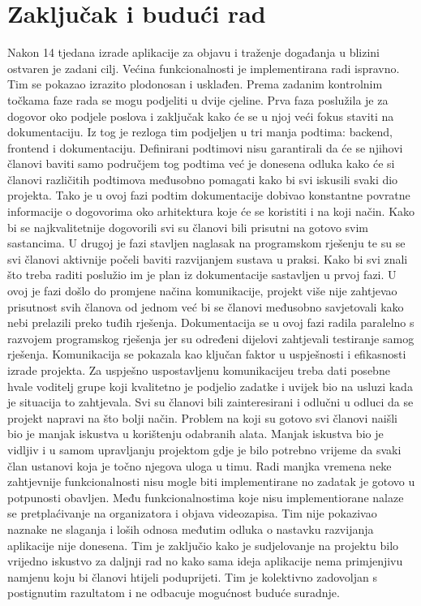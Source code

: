 \chapter{Zaključak i budući rad}
		
		Nakon 14 tjedana izrade aplikacije za objavu i traženje događanja u blizini ostvaren je zadani cilj. Većina funkcionalnosti je implementirana radi ispravno. Tim se pokazao izrazito plodonosan i usklađen. Prema zadanim kontrolnim točkama faze rada se mogu podjeliti u dvije cjeline. 
		Prva faza poslužila je za dogovor oko podjele poslova i zaključak kako će se u njoj veći fokus staviti na dokumentaciju. Iz tog je rezloga tim podjeljen u tri manja podtima: backend, frontend i dokumentaciju. Definirani podtimovi nisu garantirali da će se njihovi članovi baviti samo područjem tog podtima već je donesena odluka kako će si članovi različitih podtimova međusobno pomagati kako bi svi iskusili svaki dio projekta. Tako je u ovoj fazi podtim dokumentacije dobivao konstantne povratne informacije o dogovorima oko arhitektura koje će se koristiti i na koji način. Kako bi se najkvalitetnije dogovorili svi su članovi bili prisutni na gotovo svim sastancima. 
		U drugoj je fazi stavljen naglasak na programskom rješenju te su se svi članovi aktivnije počeli baviti razvijanjem sustava u praksi. Kako bi svi znali što treba raditi poslužio im je plan iz dokumentacije sastavljen u prvoj fazi. U ovoj je fazi došlo do promjene načina komunikacije, projekt više nije zahtjevao prisutnost svih članova od jednom već bi se članovi međusobno savjetovali kako nebi prelazili preko tuđih rješenja. Dokumentacija se u ovoj fazi radila paralelno s razvojem programskog rješenja jer su određeni dijelovi zahtjevali testiranje samog rješenja. 
		Komunikacija se pokazala kao ključan faktor u uspješnosti i efikasnosti izrade projekta. Za uspješno uspostavljenu komunikacijeu treba dati posebne hvale voditelj grupe koji kvalitetno je podjelio zadatke i uvijek bio na usluzi kada je situacija to zahtjevala. Svi su članovi bili zainteresirani i odlučni u odluci da se projekt napravi na što bolji način. 
		Problem na koji su gotovo svi članovi naišli bio je manjak iskustva u korištenju odabranih alata. Manjak iskustva bio je vidljiv i u samom upravljanju projektom gdje je bilo potrebno vrijeme da svaki član ustanovi koja je točno njegova uloga u timu.
		Radi manjka vremena neke zahtjevnije funkcionalnosti nisu mogle biti implementirane no zadatak je gotovo u potpunosti obavljen. Među funkcionalnostima koje nisu implementiorane nalaze se pretplaćivanje na organizatora i objava videozapisa.
		Tim nije pokazivao naznake ne slaganja i loših odnosa međutim odluka o nastavku razvijanja aplikacije nije donesena. Tim je zaključio kako je sudjelovanje na projektu bilo vrijedno iskustvo za daljnji rad no kako sama ideja aplikacije nema primjenjivu namjenu koju bi članovi htijeli poduprijeti. Tim je kolektivno zadovoljan s postignutim razultatom i ne odbacuje mogućnost buduće suradnje.
		